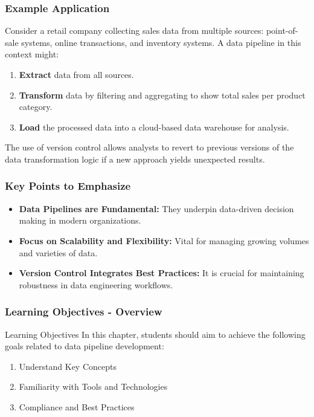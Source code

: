 \documentclass{beamer}
\begin{document}
\begin{frame}[fragile]
    \frametitle{Example Application}
    Consider a retail company collecting sales data from multiple sources: point-of-sale systems, online transactions, and inventory systems. A data pipeline in this context might:
    
    \begin{enumerate}
        \item \textbf{Extract} data from all sources.
        \item \textbf{Transform} data by filtering and aggregating to show total sales per product category.
        \item \textbf{Load} the processed data into a cloud-based data warehouse for analysis.
    \end{enumerate}

    The use of version control allows analysts to revert to previous versions of the data transformation logic if a new approach yields unexpected results.
\end{frame}

\begin{frame}[fragile]
    \frametitle{Key Points to Emphasize}
    \begin{itemize}
        \item \textbf{Data Pipelines are Fundamental:} They underpin data-driven decision making in modern organizations.
        \item \textbf{Focus on Scalability and Flexibility:} Vital for managing growing volumes and varieties of data.
        \item \textbf{Version Control Integrates Best Practices:} It is crucial for maintaining robustness in data engineering workflows.
    \end{itemize}
\end{frame}

\begin{frame}[fragile]
    \frametitle{Learning Objectives - Overview}
    \begin{block}{Learning Objectives}
        In this chapter, students should aim to achieve the following goals related to data pipeline development:
    \end{block}
    \begin{enumerate}
        \item Understand Key Concepts
        \item Familiarity with Tools and Technologies
        \item Compliance and Best Practices
    \end{enumerate}
\end{frame}
\end{document}
